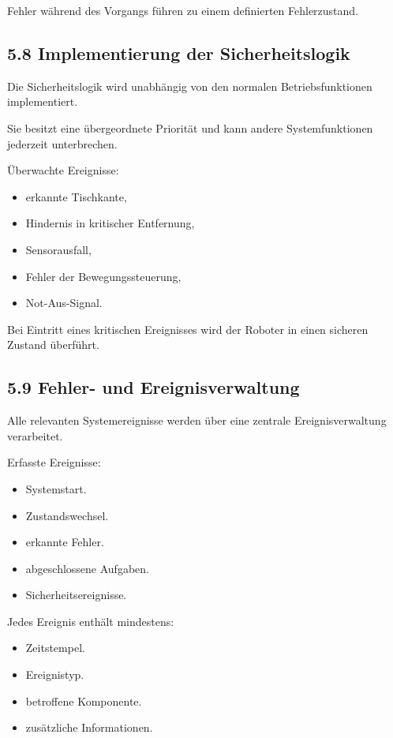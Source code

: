 \documentclass[
  a4paper,
  12pt,
  DIV=12,        %
  parskip=half,  %
  headings=small %
]{scrartcl}
\theoremstyle{definition}
\providecommand{\tightlist}{%
  \setlength{\itemsep}{0pt}\setlength{\parskip}{0pt}}
\theoremstyle{definition}
\providecommand{\tightlist}{%
  \setlength{\itemsep}{0pt}\setlength{\parskip}{0pt}}
\begin{document}
Fehler während des Vorgangs führen zu einem definierten Fehlerzustand.

\subsection{5.8 Implementierung der
Sicherheitslogik}\label{implementierung-der-sicherheitslogik}

Die Sicherheitslogik wird unabhängig von den normalen Betriebsfunktionen
implementiert.

Sie besitzt eine übergeordnete Priorität und kann andere
Systemfunktionen jederzeit unterbrechen.

Überwachte Ereignisse:

\begin{itemize}
\tightlist
\item
  erkannte Tischkante,
\item
  Hindernis in kritischer Entfernung,
\item
  Sensorausfall,
\item
  Fehler der Bewegungssteuerung,
\item
  Not-Aus-Signal.
\end{itemize}

Bei Eintritt eines kritischen Ereignisses wird der Roboter in einen
sicheren Zustand überführt.

\subsection{5.9 Fehler- und
Ereignisverwaltung}\label{fehler--und-ereignisverwaltung}

Alle relevanten Systemereignisse werden über eine zentrale
Ereignisverwaltung verarbeitet.

Erfasste Ereignisse:

\begin{itemize}
\tightlist
\item
  Systemstart.
\item
  Zustandswechsel.
\item
  erkannte Fehler.
\item
  abgeschlossene Aufgaben.
\item
  Sicherheitsereignisse.
\end{itemize}

Jedes Ereignis enthält mindestens:

\begin{itemize}
\tightlist
\item
  Zeitstempel.
\item
  Ereignistyp.
\item
  betroffene Komponente.
\item
  zusätzliche Informationen.
\end{itemize}
\end{document}

